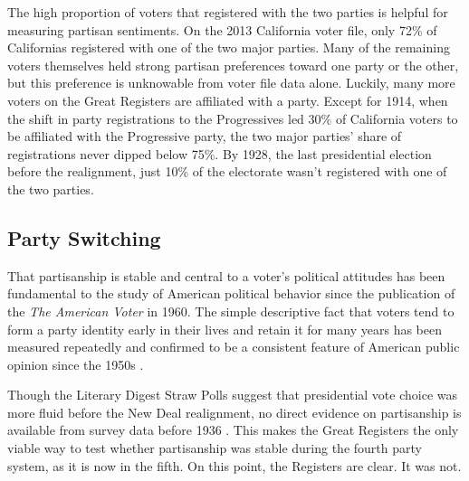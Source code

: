\documentclass[11pt]{scrartcl}\usepackage[]{graphicx}\usepackage[]{color}
\begin{document}
The high proportion of voters that registered with the two parties is helpful for measuring partisan sentiments.  On the 2013 California voter file, only 72\% of Californias registered with one of the two major parties. Many of the remaining voters themselves held strong partisan preferences toward one party or the other, but this preference is unknowable from voter file data alone. Luckily, many more voters on the Great Registers are affiliated with a party.  Except for 1914, when the shift in party registrations to the Progressives led 30\% of California voters to be affiliated with the Progressive party, the two major parties' share of registrations never dipped below 75\%.  By 1928, the last presidential election before the realignment, just 10\% of the electorate wasn't registered with one of the two parties.



\subsection*{Party Switching}



That partisanship is stable and central to a voter's political attitudes has been fundamental to the study of American political behavior since the publication of the \emph{The American Voter} in 1960. The simple descriptive fact that voters tend to form a party identity early in their lives and retain it for many years has been measured repeatedly and confirmed to be a consistent feature of American public opinion since the 1950s \citep{green1994stable, clarke2009dynamics}. 





Though the Literary Digest Straw Polls suggest that presidential vote choice was more fluid before the New Deal realignment, no direct evidence on partisanship is available from survey data before 1936  \citep{erikson1981partisan}. This makes the Great Registers the only viable way to test whether partisanship was stable during the fourth party system, as it is now in the fifth. On this point, the Registers are clear. It was not.
\end{document}
